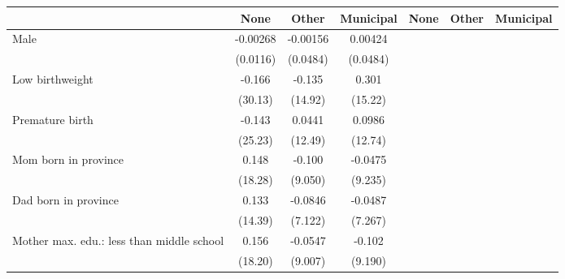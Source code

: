 {
\def\sym#1{\ifmmode^{#1}\else\(^{#1}\)\fi}
\begin{tabular}{l*{6}{c}}
\toprule
                    &\multicolumn{1}{c}{None}&\multicolumn{1}{c}{Other}&\multicolumn{1}{c}{Municipal}&\multicolumn{1}{c}{None}&\multicolumn{1}{c}{Other}&\multicolumn{1}{c}{Municipal}\\
\midrule
Male                &    -0.00268         &    -0.00156         &     0.00424         &                     &                     &                     \\
                    &    (0.0116)         &    (0.0484)         &    (0.0484)         &                     &                     &                     \\
\addlinespace
Low birthweight     &      -0.166         &      -0.135         &       0.301         &                     &                     &                     \\
                    &     (30.13)         &     (14.92)         &     (15.22)         &                     &                     &                     \\
\addlinespace
Premature birth     &      -0.143         &      0.0441         &      0.0986         &                     &                     &                     \\
                    &     (25.23)         &     (12.49)         &     (12.74)         &                     &                     &                     \\
\addlinespace
Mom born in province&       0.148         &      -0.100         &     -0.0475         &                     &                     &                     \\
                    &     (18.28)         &     (9.050)         &     (9.235)         &                     &                     &                     \\
\addlinespace
Dad born in province&       0.133         &     -0.0846         &     -0.0487         &                     &                     &                     \\
                    &     (14.39)         &     (7.122)         &     (7.267)         &                     &                     &                     \\
\addlinespace
Mother max. edu.: less than middle school&       0.156         &     -0.0547         &      -0.102         &                     &                     &                     \\
                    &     (18.20)         &     (9.007)         &     (9.190)         &                     &                     &                     \\

\end{tabular}}
